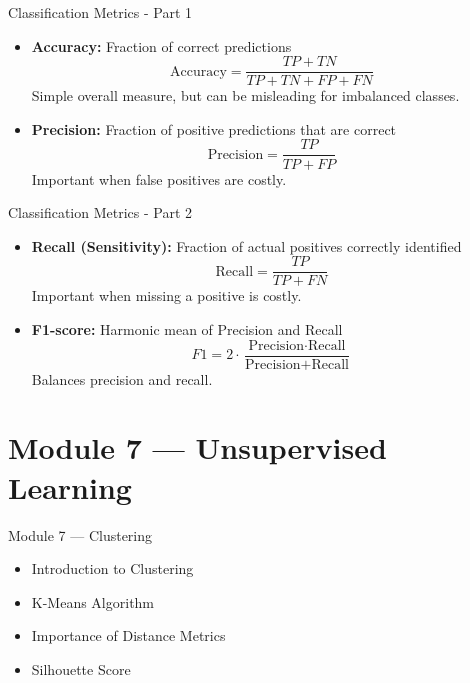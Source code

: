 \documentclass{beamer}
\begin{document}
\begin{frame}{Classification Metrics - Part 1}

\begin{itemize}
    \item \textbf{Accuracy:} Fraction of correct predictions
    \[
    \text{Accuracy} = \frac{TP + TN}{TP + TN + FP + FN}
    \]
    Simple overall measure, but can be misleading for imbalanced classes.
    
    \item \textbf{Precision:} Fraction of positive predictions that are correct
    \[
    \text{Precision} = \frac{TP}{TP + FP}
    \]
    Important when false positives are costly.
\end{itemize}

\end{frame}

\begin{frame}{Classification Metrics - Part 2}

\begin{itemize}
    \item \textbf{Recall (Sensitivity):} Fraction of actual positives correctly identified
    \[
    \text{Recall} = \frac{TP}{TP + FN}
    \]
    Important when missing a positive is costly.
    
    \item \textbf{F1-score:} Harmonic mean of Precision and Recall
    \[
    F1 = 2 \cdot \frac{\text{Precision} \cdot \text{Recall}}{\text{Precision} + \text{Recall}}
    \]
    Balances precision and recall.
\end{itemize}

\end{frame}




\section{Module 7 — Unsupervised Learning}

\begin{frame}{Module 7 — Clustering}
\begin{itemize}
    \item Introduction to Clustering
    \item K-Means Algorithm
    \item Importance of Distance Metrics
    \item Silhouette Score
\end{itemize}
\end{frame}
\end{document}
